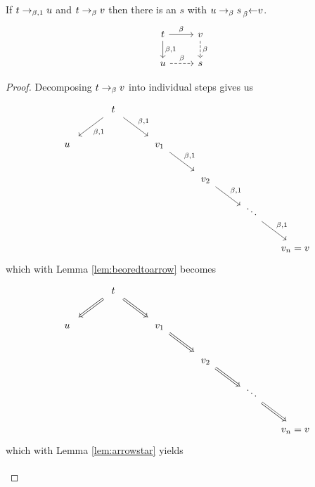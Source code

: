 \begin{boxlem}\label{lem:almostconfluence}
    If $t \to_{\beta, 1} u$ and $t \to_{\beta} v$ then there is an $s$ with $u \to_{\beta} s \prescript{}{\beta}{\leftarrow} v$.
    \begin{equation*}
        \begin{tikzcd}[ampersand replacement=\&]
            t \ar[r, "\beta"] \ar[d, "{\beta, 1}"] \& v \ar[d, dashed, "\beta"] \\
            u \ar[r, dashed, "\beta"] \& s
        \end{tikzcd}
    \end{equation*}
\end{boxlem}
\begin{proof}
    Decomposing $t \to_{\beta} v$ into individual steps gives us
    \begin{equation*}
        \begin{tikzcd}[/tikz/cells={/tikz/nodes={shape=asymmetrical
            rectangle,text width=0.5cm,text height=2ex,text depth=0.3ex,align=center}}]
            & t \ar[dl, "{\beta, 1}"] \ar[dr, "{\beta, 1}"] & \\
            u && v_1 \ar[dr, "{\beta, 1}"] \\
            &&& v_2 \ar[dr, "{\beta, 1}"] \\
            &&&& \ddots \ar[dr, "{\beta, 1}"] \\
            &&&&& \mathllap{v_n} = \mathrlap{v}
        \end{tikzcd}
    \end{equation*}
    which with Lemma \ref{lem:beoredtoarrow} becomes
    \begin{equation*}
        \begin{tikzcd}[/tikz/cells={/tikz/nodes={shape=asymmetrical
            rectangle,text width=0.5cm,text height=2ex,text depth=0.3ex,align=center}}]
            & t \ar[dl, Rightarrow] \ar[dr, Rightarrow] & \\
            u && v_1 \ar[dr, Rightarrow] \\
            &&& v_2 \ar[dr, Rightarrow] \\
            &&&& \ddots \ar[dr, Rightarrow] \\
            &&&&& \mathllap{v_n} = \mathrlap{v}
        \end{tikzcd}
    \end{equation*}
    which with Lemma \ref{lem:arrowstar} yields
    \begin{equation*}
        \begin{tikzcd}[/tikz/cells={/tikz/nodes={shape=asymmetrical
            rectangle,text width=0.5cm,text height=2ex,text depth=0.3ex,align=center}}]

\end{tikzcd}
\end{equation*}
\end{proof}
